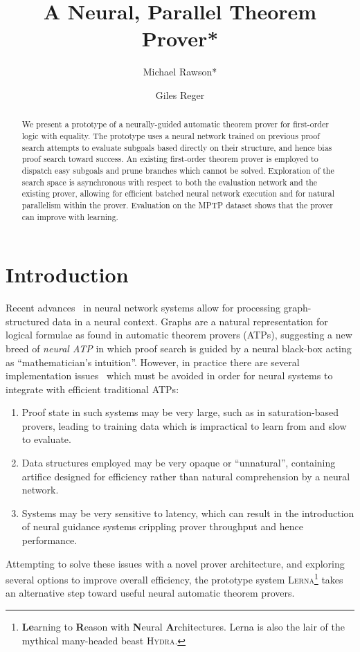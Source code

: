 \documentclass{llncs}
\newcommand{\lerna}{\textsc{Lerna}}
\begin{document}
\title{A Neural, Parallel Theorem Prover*}
\author{
	Michael Rawson* \and
	Giles Reger
}
\maketitle

\begin{abstract}
	We present a prototype of a neurally-guided automatic theorem prover for first-order logic with equality.
	The prototype uses a neural network trained on previous proof search attempts to evaluate subgoals based directly on their structure, and hence bias proof search toward success.
	An existing first-order theorem prover is employed to dispatch easy subgoals and prune branches which cannot be solved.
	Exploration of the search space is asynchronous with respect to both the evaluation network and the existing prover, allowing for efficient batched neural network execution and for natural parallelism within the prover.
	Evaluation on the MPTP dataset shows that the prover can improve with learning.
\end{abstract}

\section{Introduction}
Recent advances~ in neural network systems allow for processing graph-structured data in a neural context.
Graphs are a natural representation for logical formulae as found in automatic theorem provers (ATPs), suggesting a new breed of \emph{neural ATP} in which proof search is guided by a neural black-box acting as ``mathematician's intuition''.
However, in practice there are several implementation issues~\cite{lerna-discussion} which must be avoided in order for neural systems to integrate with efficient traditional ATPs:
\begin{enumerate}
	\item Proof state in such systems may be very large, such as in saturation-based provers, leading to training data which is impractical to learn from and slow to evaluate.
	\item Data structures employed may be very opaque or ``unnatural'', containing artifice designed for efficiency rather than natural comprehension by a neural network.
	\item Systems may be very sensitive to latency, which can result in the introduction of neural guidance systems crippling prover throughput and hence performance.
\end{enumerate}
%
Attempting to solve these issues with a novel prover architecture, and exploring several options to improve overall efficiency, the prototype system \lerna{}\footnote{\textbf{Le}arning to \textbf{R}eason with \textbf{N}eural \textbf{A}rchitectures. Lerna is also the lair of the mythical many-headed beast \textsc{Hydra}.} takes an alternative step toward useful neural automatic theorem provers.
\end{document}
